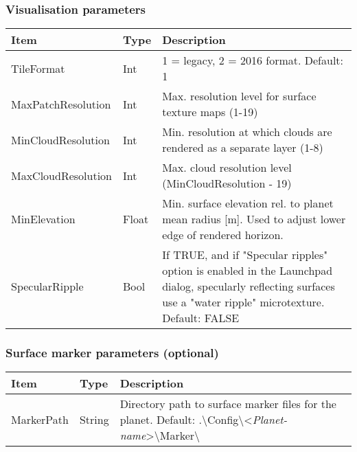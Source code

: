 \documentclass[Orbiter Developer Manual.tex]{subfiles}
\begin{document}
\subsubsection*{Visualisation parameters}
	\begin{longtable}{ |p{}|p{}|p{}| }
	\hline\rule{0pt}{2ex}
	\textbf{Item} & \textbf{Type} & \textbf{Description}\\
	\hline\rule{0pt}{2ex}
	TileFormat & Int & 1 = legacy, 2 = 2016 format. Default: 1\\
	\hline\rule{0pt}{2ex}
	MaxPatchResolution & Int & Max. resolution level for surface texture maps (1-19)\\
	\hline\rule{0pt}{2ex}
	MinCloudResolution & Int & Min. resolution at which clouds are rendered as a separate layer (1-8)\\
	\hline\rule{0pt}{2ex}
	MaxCloudResolution & Int & Max. cloud resolution level (MinCloudResolution - 19)\\
	\hline\rule{0pt}{2ex}
	MinElevation & Float & Min. surface elevation rel. to planet mean radius [m]. Used to adjust lower edge of rendered horizon.\\
	\hline\rule{0pt}{2ex}
	SpecularRipple & Bool & If TRUE, and if "Specular ripples" option is enabled in the Launchpad dialog, specularly reflecting surfaces use a "water ripple" microtexture. Default: FALSE\\
	\hline
	\end{longtable}


\subsubsection*{Surface marker parameters (optional)}
	\begin{longtable}{ |p{}|p{}|p{}| }
	\hline\rule{0pt}{2ex}
	\textbf{Item} & \textbf{Type} & \textbf{Description}\\
	\hline\rule{0pt}{2ex}
	MarkerPath & String & Directory path to surface marker files for the planet. Default: .\textbackslash Config\textbackslash <\textit{Planet-name}>\textbackslash Marker\textbackslash \\
	\hline
	\end{longtable}
\end{document}
